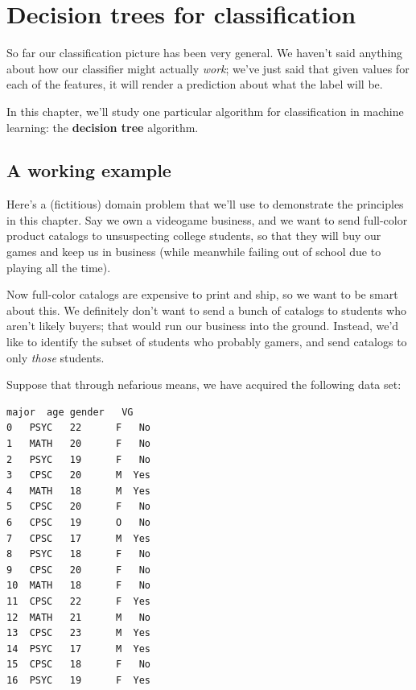 
\chapter{Decision trees for classification}

So far our classification picture has been very general. We haven't said
anything about how our classifier might actually \textit{work}; we've just said
that given values for each of the features, it will render a prediction about
what the label will be.


In this chapter, we'll study one particular algorithm for classification in
machine learning: the \textbf{decision tree} algorithm.

\section{A working example}

 
Here's a (fictitious) domain problem that we'll use to demonstrate the
principles in this chapter. Say we own a videogame business, and we want to
send full-color product catalogs to unsuspecting college students, so that they
will buy our games and keep us in business (while meanwhile failing out of
school due to playing all the time).

Now full-color catalogs are expensive to print and ship, so we want to be smart
about this. We definitely don't want to send a bunch of catalogs to students
who aren't likely buyers; that would run our business into the ground. Instead,
we'd like to identify the subset of students who probably gamers, and send
catalogs to only \textit{those} students.

Suppose that through nefarious means, we have acquired the following data set:

\begin{Verbatim}[fontsize=\small,samepage=true,frame=single,framesep=3mm,xleftmargin=4.3cm,xrightmargin=4.2cm]
   major  age gender   VG
0   PSYC   22      F   No
1   MATH   20      F   No
2   PSYC   19      F   No
3   CPSC   20      M  Yes
4   MATH   18      M  Yes
5   CPSC   20      F   No
6   CPSC   19      O   No
7   CPSC   17      M  Yes
8   PSYC   18      F   No
9   CPSC   20      F   No
10  MATH   18      F   No
11  CPSC   22      F  Yes
12  MATH   21      M   No
13  CPSC   23      M  Yes
14  PSYC   17      M  Yes
15  CPSC   18      F   No
16  PSYC   19      F  Yes
\end{Verbatim}

